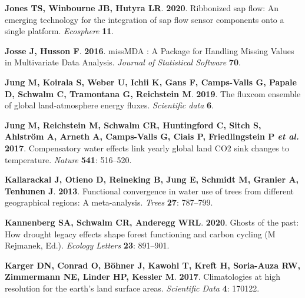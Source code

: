 \documentclass[11pt,twoside]{reedthesis}
\begin{document}
\hypertarget{ref-jones_ribbonized_2020}{}
\textbf{\textnormal{Jones TS}, \textnormal{Winbourne JB},
\textnormal{Hutyra LR}}. \textbf{2020}. Ribbonized sap flow: An emerging
technology for the integration of sap flow sensor components onto a
single platform. \emph{Ecosphere} \textbf{11}.

\hypertarget{ref-josse_missmda_2016}{}
\textbf{\textnormal{Josse J}, \textnormal{Husson F}}. \textbf{2016}.
missMDA : A Package for Handling Missing Values in Multivariate Data
Analysis. \emph{Journal of Statistical Software} \textbf{70}.

\hypertarget{ref-Jung2019}{}
\textbf{\textnormal{Jung M}, \textnormal{Koirala S}, \textnormal{Weber
U}, \textnormal{Ichii K}, \textnormal{Gans F}, \textnormal{Camps-Valls
G}, \textnormal{Papale D}, \textnormal{Schwalm C},
\textnormal{Tramontana G}, \textnormal{Reichstein M}}. \textbf{2019}.
The fluxcom ensemble of global land-atmosphere energy fluxes.
\emph{Scientific data} \textbf{6}.

\hypertarget{ref-jung_compensatory_2017}{}
\textbf{\textnormal{Jung M}, \textnormal{Reichstein M},
\textnormal{Schwalm CR}, \textnormal{Huntingford C}, \textnormal{Sitch
S}, \textnormal{Ahlström A}, \textnormal{Arneth A},
\textnormal{Camps-Valls G}, \textnormal{Ciais P},
\textnormal{Friedlingstein P} \emph{et al.}} \textbf{2017}. Compensatory
water effects link yearly global land CO2 sink changes to temperature.
\emph{Nature} \textbf{541}: 516--520.

\hypertarget{ref-Kallarackal2013}{}
\textbf{\textnormal{Kallarackal J}, \textnormal{Otieno D},
\textnormal{Reineking B}, \textnormal{Jung E}, \textnormal{Schmidt M},
\textnormal{Granier A}, \textnormal{Tenhunen J}}. \textbf{2013}.
Functional convergence in water use of trees from different geographical
regions: A meta-analysis. \emph{Trees} \textbf{27}: 787--799.

\hypertarget{ref-kannenberg_ghosts_2020}{}
\textbf{\textnormal{Kannenberg SA}, \textnormal{Schwalm CR},
\textnormal{Anderegg WRL}}. \textbf{2020}. Ghosts of the past: How
drought legacy effects shape forest functioning and carbon cycling (M
Rejmanek, Ed.). \emph{Ecology Letters} \textbf{23}: 891--901.

\hypertarget{ref-karger_climatologies_2017}{}
\textbf{\textnormal{Karger DN}, \textnormal{Conrad O},
\textnormal{Böhner J}, \textnormal{Kawohl T}, \textnormal{Kreft H},
\textnormal{Soria-Auza RW}, \textnormal{Zimmermann NE},
\textnormal{Linder HP}, \textnormal{Kessler M}}. \textbf{2017}.
Climatologies at high resolution for the earth's land surface areas.
\emph{Scientific Data} \textbf{4}: 170122.
\end{document}
